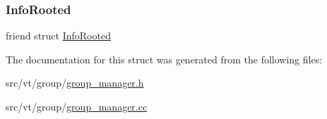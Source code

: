 \subsubsection{\texorpdfstring{Info\+Rooted}{InfoRooted}}
{\footnotesize\ttfamily friend struct \hyperlink{structvt_1_1group_1_1_info_rooted}{Info\+Rooted}\hspace{0.3cm}{\ttfamily [friend]}}



The documentation for this struct was generated from the following files\+:\begin{DoxyCompactItemize}
\item 
src/vt/group/\hyperlink{group__manager_8h}{group\+\_\+manager.\+h}\item 
src/vt/group/\hyperlink{group__manager_8cc}{group\+\_\+manager.\+cc}\end{DoxyCompactItemize}
